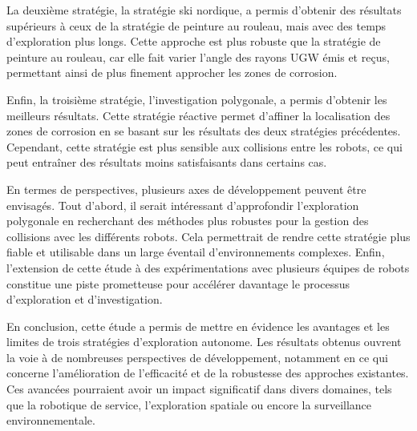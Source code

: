 \documentclass[francais,RandD]{rapportPFE}
\begin{document}
		La deuxième stratégie, la stratégie ski nordique, a permis d'obtenir des résultats supérieurs à ceux de la stratégie de peinture au rouleau, mais avec des temps d'exploration plus longs.
		Cette approche est plus robuste que la stratégie de peinture au rouleau, car elle fait varier l'angle des rayons UGW émis et reçus, permettant ainsi de plus finement approcher les zones de corrosion.

		Enfin, la troisième stratégie, l'investigation polygonale, a permis d'obtenir les meilleurs résultats.
		Cette stratégie réactive permet d'affiner la localisation des zones de corrosion en se basant sur les résultats des deux stratégies précédentes.
		Cependant, cette stratégie est plus sensible aux collisions entre les robots, ce qui peut entraîner des résultats moins satisfaisants dans certains cas.

		En termes de perspectives, plusieurs axes de développement peuvent être envisagés.
		Tout d'abord, il serait intéressant d'approfondir l'exploration polygonale en recherchant des méthodes plus robustes pour la gestion des collisions avec les différents robots.
		Cela permettrait de rendre cette stratégie plus fiable et utilisable dans un large éventail d'environnements complexes.
		Enfin, l'extension de cette étude à des expérimentations avec plusieurs équipes de robots constitue une piste prometteuse pour accélérer davantage le processus d'exploration et d'investigation.

		En conclusion, cette étude a permis de mettre en évidence les avantages et les limites de trois stratégies d'exploration autonome. Les résultats obtenus ouvrent la voie à de nombreuses perspectives de développement, notamment en ce qui concerne l'amélioration de l'efficacité et de la robustesse des approches existantes. Ces avancées pourraient avoir un impact significatif dans divers domaines, tels que la robotique de service, l'exploration spatiale ou encore la surveillance environnementale.
	
	
	\appendix
\end{document}
